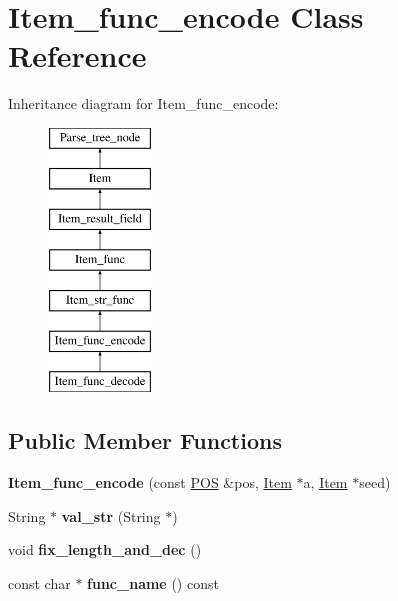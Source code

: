 \hypertarget{classItem__func__encode}{}\section{Item\+\_\+func\+\_\+encode Class Reference}
\label{classItem__func__encode}
Inheritance diagram for Item\+\_\+func\+\_\+encode\+:\begin{figure}[H]
\begin{center}
\leavevmode
\includegraphics[height=7.000000cm]{classItem__func__encode}
\end{center}
\end{figure}
\subsection*{Public Member Functions}
\begin{DoxyCompactItemize}
\item 
\mbox{\label{classItem__func__encode_a475ca191a2a1fda404aae47eb5cdc5ab}} 
{\bfseries Item\+\_\+func\+\_\+encode} (const \mbox{\hyperlink{structYYLTYPE}{P\+OS}} \&pos, \mbox{\hyperlink{classItem}{Item}} $\ast$a, \mbox{\hyperlink{classItem}{Item}} $\ast$seed)
\item 
\mbox{\label{classItem__func__encode_aadfbfca36056cb716f7daaee5c0f6be2}} 
String $\ast$ {\bfseries val\+\_\+str} (String $\ast$)
\item 
\mbox{\label{classItem__func__encode_a2f056db6dcc8f477767588549b6147ff}} 
void {\bfseries fix\+\_\+length\+\_\+and\+\_\+dec} ()
\item 
\mbox{\label{classItem__func__encode_a74934b5f4078d217498ac20f5dff2030}} 
const char $\ast$ {\bfseries func\+\_\+name} () const
\end{DoxyCompactItemize}
